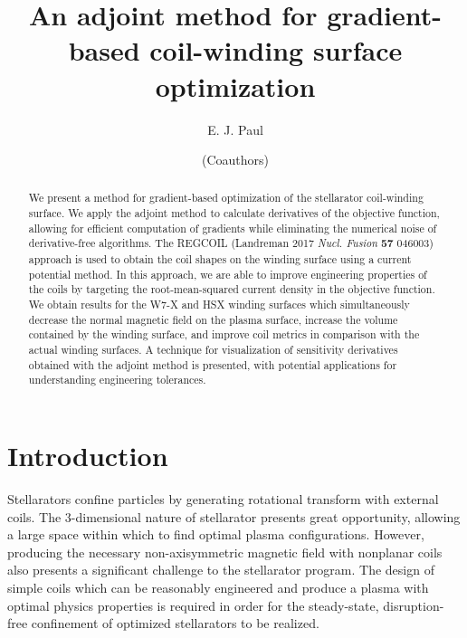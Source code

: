 \documentclass[aps,unsortedaddress]{revtex4-1}
\begin{document}
\title{An adjoint method for gradient-based coil-winding surface optimization}
\author{E. J. Paul}

\author{(Coauthors)}

\begin{abstract}
We present a method for gradient-based optimization of the stellarator coil-winding surface. We apply the adjoint method to calculate derivatives of the objective function, allowing for efficient computation of gradients while eliminating the numerical noise of derivative-free algorithms. The REGCOIL (Landreman 2017 \textit{Nucl. Fusion} \textbf{57} 046003) approach is used to obtain the coil shapes on the winding surface using a current potential method. In this approach, we are able to improve engineering properties of the coils by targeting the root-mean-squared current density in the objective function. We obtain results for the W7-X and HSX winding surfaces which simultaneously decrease the normal magnetic field on the plasma surface,  increase the volume contained by the winding surface, and improve coil metrics in comparison with the actual winding surfaces. A technique for visualization of sensitivity derivatives obtained with the adjoint method is presented, with potential applications for understanding engineering tolerances. 
\end{abstract}

\maketitle

\section{Introduction}
Stellarators confine particles by generating rotational transform with external coils. The 3-dimensional nature of stellarator presents great opportunity, allowing a large space within which to find optimal plasma configurations. However, producing the necessary non-axisymmetric magnetic field with nonplanar coils also presents a significant challenge to the stellarator program. The design of simple coils which can be reasonably engineered and produce a plasma with optimal physics properties is required in order for the steady-state, disruption-free confinement of optimized stellarators to be realized. 
\end{document}
